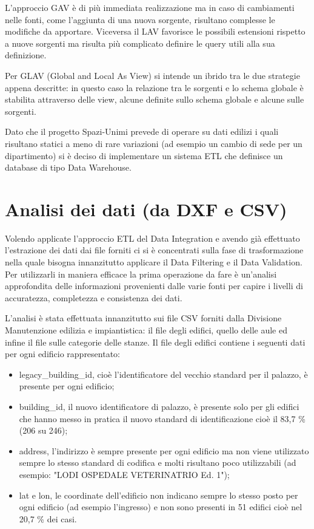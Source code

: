 \documentclass[12pt]{report}
\begin{document}
L'approccio GAV è di più immediata realizzazione ma in caso di cambiamenti nelle fonti, come l'aggiunta di una nuova sorgente, risultano complesse le modifiche da apportare.
Viceversa il LAV favorisce le possibili estensioni rispetto a nuove sorgenti ma risulta più complicato definire le query utili alla sua definizione.     

Per GLAV (Global and Local As View) si intende un ibrido tra le due strategie appena descritte: in questo caso la relazione tra le sorgenti e lo schema globale è stabilita attraverso delle view, alcune definite sullo schema globale e alcune sulle sorgenti.

\vspace{5mm} %

Dato che il progetto Spazi-Unimi prevede di operare su dati edilizi i quali risultano statici a meno di rare variazioni (ad esempio un cambio di sede per un dipartimento) si è deciso di implementare un sistema ETL che definisce un database di tipo Data Warehouse.


\newpage
\section{Analisi dei dati (da DXF e CSV)}

Volendo applicate l'approccio ETL del Data Integration e avendo già effettuato l'estrazione dei dati dai file forniti ci si è concentrati sulla fase di trasformazione nella quale bisogna innanzitutto applicare il Data Filtering e il Data Validation.
Per utilizzarli in maniera efficace la prima operazione da fare è un'analisi approfondita delle informazioni provenienti dalle varie fonti per capire i livelli di accuratezza, completezza e consistenza dei dati.

\vspace{5mm} %

L'analisi è stata effettuata innanzitutto sui file CSV forniti dalla Divisione Manutenzione edilizia e impiantistica: il file degli edifici, quello delle aule ed infine il file sulle categorie delle stanze.
Il file degli edifici contiene i seguenti dati per ogni edificio rappresentato:
\begin{itemize}
\item legacy\_building\_id, cioè l'identificatore del vecchio standard per il palazzo, è presente per ogni edificio;
\item building\_id, il nuovo identificatore di palazzo, è presente solo per gli edifici che hanno messo in pratica il nuovo standard di identificazione cioè il 83,7 \% (206 su 246);
\item address, l'indirizzo è sempre presente per ogni edificio ma non viene utilizzato sempre lo stesso standard di codifica e molti risultano poco utilizzabili (ad esempio: "LODI OSPEDALE VETERINATRIO Ed. 1");
\item lat e lon, le coordinate dell'edificio non indicano sempre lo stesso posto per ogni edificio (ad esempio l'ingresso) e non sono presenti in 51 edifici cioè nel 20,7 \% dei casi.
\end{itemize}
\end{document}
